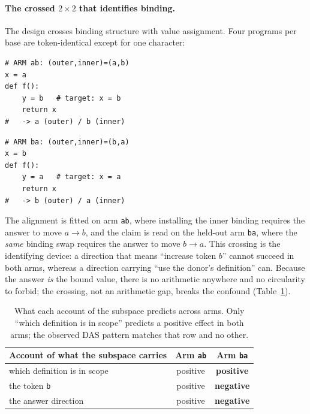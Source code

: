 \documentclass[10pt]{article}
\newcommand{\code}[1]{\texttt{#1}}
\begin{document}
\paragraph{The crossed $2\times2$ that identifies binding.} The design crosses
binding structure with value assignment. Four programs per base are
token-identical except for one character:
\begin{center}
\begin{minipage}{0.46\linewidth}
\begin{lstlisting}
# ARM ab: (outer,inner)=(a,b)
x = a
def f():
    y = b   # target: x = b
    return x
#   -> a (outer) / b (inner)
\end{lstlisting}
\end{minipage}\hfill
\begin{minipage}{0.46\linewidth}
\begin{lstlisting}
# ARM ba: (outer,inner)=(b,a)
x = b
def f():
    y = a   # target: x = a
    return x
#   -> b (outer) / a (inner)
\end{lstlisting}
\end{minipage}
\end{center}
The alignment is fitted on arm \code{ab}, where installing the inner binding
requires the answer to move $a\!\to\!b$, and the claim is read on the held-out arm
\code{ba}, where the \emph{same} binding swap requires the answer to move
$b\!\to\!a$. This crossing is the identifying device: a direction that means
``increase token $b$'' cannot succeed in both arms, whereas a direction carrying
``use the donor's definition'' can. Because the answer \emph{is} the bound value,
there is no arithmetic anywhere and no circularity to forbid; the crossing, not an
arithmetic gap, breaks the confound (Table~\ref{tab:das-identify}).

\begin{table}[t]
\centering
\small
\caption{What each account of the subspace predicts across arms. Only ``which
definition is in scope'' predicts a positive effect in both arms; the observed
DAS pattern matches that row and no other.}
\label{tab:das-identify}
\begin{tabular}{@{}lcc@{}}
\toprule
Account of what the subspace carries & Arm \code{ab} & Arm \code{ba} \\
\midrule
which definition is in scope & positive & \textbf{positive} \\
the token \code{b}           & positive & \textbf{negative} \\
the answer direction         & positive & \textbf{negative} \\
\bottomrule
\end{tabular}
\end{table}
\end{document}
